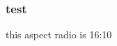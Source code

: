 \documentclass[aspectratio=1610]{beamer}
\begin{document}
\begin{frame}
    \frametitle{test}

    this aspect radio is 16:10

\end{frame}
\end{document}
